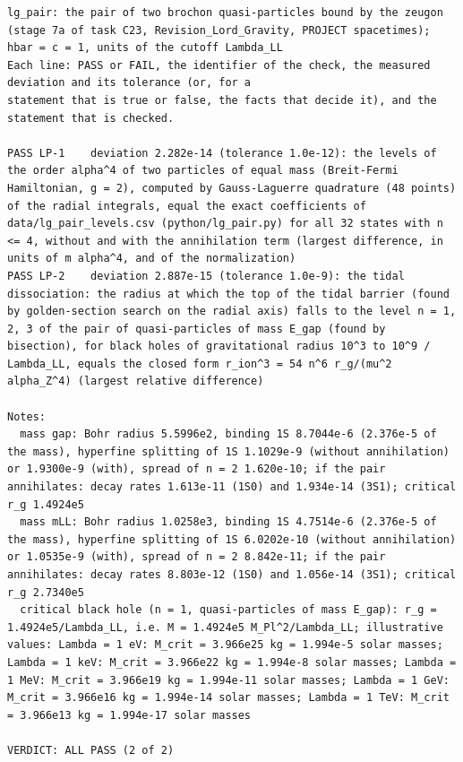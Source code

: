 \documentclass[
  10pt,
]{article}
\begin{document}
\begin{verbatim}
lg_pair: the pair of two brochon quasi-particles bound by the zeugon (stage 7a of task C23, Revision_Lord_Gravity, PROJECT spacetimes); hbar = c = 1, units of the cutoff Lambda_LL
Each line: PASS or FAIL, the identifier of the check, the measured deviation and its tolerance (or, for a
statement that is true or false, the facts that decide it), and the statement that is checked.

PASS LP-1    deviation 2.282e-14 (tolerance 1.0e-12): the levels of the order alpha^4 of two particles of equal mass (Breit-Fermi Hamiltonian, g = 2), computed by Gauss-Laguerre quadrature (48 points) of the radial integrals, equal the exact coefficients of data/lg_pair_levels.csv (python/lg_pair.py) for all 32 states with n <= 4, without and with the annihilation term (largest difference, in units of m alpha^4, and of the normalization)
PASS LP-2    deviation 2.887e-15 (tolerance 1.0e-9): the tidal dissociation: the radius at which the top of the tidal barrier (found by golden-section search on the radial axis) falls to the level n = 1, 2, 3 of the pair of quasi-particles of mass E_gap (found by bisection), for black holes of gravitational radius 10^3 to 10^9 / Lambda_LL, equals the closed form r_ion^3 = 54 n^6 r_g/(mu^2 alpha_Z^4) (largest relative difference)

Notes:
  mass gap: Bohr radius 5.5996e2, binding 1S 8.7044e-6 (2.376e-5 of the mass), hyperfine splitting of 1S 1.1029e-9 (without annihilation) or 1.9300e-9 (with), spread of n = 2 1.620e-10; if the pair annihilates: decay rates 1.613e-11 (1S0) and 1.934e-14 (3S1); critical r_g 1.4924e5
  mass mLL: Bohr radius 1.0258e3, binding 1S 4.7514e-6 (2.376e-5 of the mass), hyperfine splitting of 1S 6.0202e-10 (without annihilation) or 1.0535e-9 (with), spread of n = 2 8.842e-11; if the pair annihilates: decay rates 8.803e-12 (1S0) and 1.056e-14 (3S1); critical r_g 2.7340e5
  critical black hole (n = 1, quasi-particles of mass E_gap): r_g = 1.4924e5/Lambda_LL, i.e. M = 1.4924e5 M_Pl^2/Lambda_LL; illustrative values: Lambda = 1 eV: M_crit = 3.966e25 kg = 1.994e-5 solar masses; Lambda = 1 keV: M_crit = 3.966e22 kg = 1.994e-8 solar masses; Lambda = 1 MeV: M_crit = 3.966e19 kg = 1.994e-11 solar masses; Lambda = 1 GeV: M_crit = 3.966e16 kg = 1.994e-14 solar masses; Lambda = 1 TeV: M_crit = 3.966e13 kg = 1.994e-17 solar masses

VERDICT: ALL PASS (2 of 2)
\end{verbatim}
\end{document}
